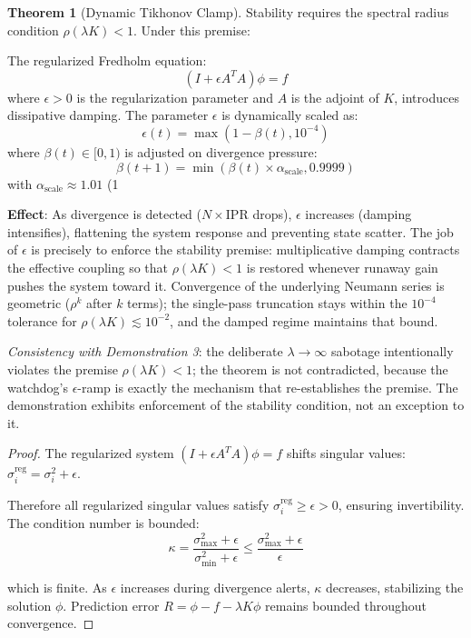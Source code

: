 \documentclass[11pt,oneside]{article}
\theoremstyle{definition}
\newtheorem{theorem}{Theorem}
\begin{document}
\begin{theorem}[Dynamic Tikhonov Clamp]
Stability requires the spectral radius condition $\rho(\lambda K) < 1$. Under this premise:

The regularized Fredholm equation:
\[
(I + \epsilon A^T A)\phi = f
\]
where $\epsilon > 0$ is the regularization parameter and $A$ is the adjoint of $K$, introduces dissipative damping. The parameter $\epsilon$ is dynamically scaled as:
\[
\epsilon(t) = \max(1 - \beta(t), 10^{-4})
\]
where $\beta(t) \in [0, 1)$ is adjusted on divergence pressure:
\[
\beta(t+1) = \min(\beta(t) \times \alpha_{\text{scale}}, 0.9999)
\]
with $\alpha_{\text{scale}} \approx 1.01$ (1%

\textbf{Effect}: As divergence is detected ($N \times \text{IPR}$ drops), $\epsilon$ increases (damping intensifies), flattening the system response and preventing state scatter. The job of $\epsilon$ is precisely to enforce the stability premise: multiplicative damping contracts the effective coupling so that $\rho(\lambda K) < 1$ is restored whenever runaway gain pushes the system toward it. Convergence of the underlying Neumann series is geometric ($\rho^{k}$ after $k$ terms); the single-pass truncation stays within the $10^{-4}$ tolerance for $\rho(\lambda K) \lesssim 10^{-2}$, and the damped regime maintains that bound.

\textit{Consistency with Demonstration 3}: the deliberate $\lambda \to \infty$ sabotage intentionally violates the premise $\rho(\lambda K) < 1$; the theorem is not contradicted, because the watchdog's $\epsilon$-ramp is exactly the mechanism that re-establishes the premise. The demonstration exhibits enforcement of the stability condition, not an exception to it.
\end{theorem}

\begin{proof}
The regularized system $(I + \epsilon A^T A)\phi = f$ shifts singular values: $\sigma_i^{\text{reg}} = \sigma_i^2 + \epsilon$.

Therefore all regularized singular values satisfy $\sigma_i^{\text{reg}} \geq \epsilon > 0$, ensuring invertibility. The condition number is bounded:
\[
\kappa = \frac{\sigma_{\max}^2 + \epsilon}{\sigma_{\min}^2 + \epsilon} \leq \frac{\sigma_{\max}^2 + \epsilon}{\epsilon}
\]

which is finite. As $\epsilon$ increases during divergence alerts, $\kappa$ decreases, stabilizing the solution $\phi$. Prediction error $R = \phi - f - \lambda K\phi$ remains bounded throughout convergence.
\end{proof}
\end{document}
